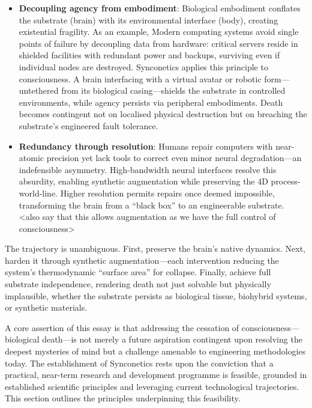\documentclass[10pt]{article}
\begin{document}
\begin{sloppypar}
  \begin{itemize}
    \item \textbf{Decoupling agency from embodiment}: Biological embodiment conflates the substrate (brain) with its environmental interface (body), creating existential fragility. As an example, Modern computing systems avoid single points of failure by decoupling data from hardware: critical servers reside in shielded facilities with redundant power and backups, surviving even if individual nodes are destroyed. Synconetics applies this principle to consciousness. A brain interfacing with a virtual avatar or robotic form—untethered from its biological casing—shields the substrate in controlled environments, while agency persists via peripheral embodiments. Death becomes contingent not on localised physical destruction but on breaching the substrate’s engineered fault tolerance.
    \item \textbf{Redundancy through resolution}: Humans repair computers with near-atomic precision yet lack tools to correct even minor neural degradation—an indefensible asymmetry. High-bandwidth neural interfaces resolve this absurdity, enabling synthetic augmentation while preserving the 4D process-world-line. Higher resolution permits repairs once deemed impossible, transforming the brain from a “black box” to an engineerable substrate. <also say that this allows augmentation as we have the full control of consciousness>
  \end{itemize}

  The trajectory is unambiguous. First, preserve the brain’s native dynamics. Next, harden it through synthetic augmentation—each intervention reducing the system’s thermodynamic “surface area” for collapse. Finally, achieve full substrate independence, rendering death not just solvable but physically implausible, whether the substrate persists as biological tissue, biohybrid systems, or synthetic materials.

  A core assertion of this essay is that addressing the cessation of consciousness—biological death—is not merely a future aspiration contingent upon resolving the deepest mysteries of mind but a challenge amenable to engineering methodologies today. The establishment of Synconetics rests upon the conviction that a practical, near-term research and development programme is feasible, grounded in established scientific principles and leveraging current technological trajectories. This section outlines the principles underpinning this feasibility.


\end{sloppypar}
\end{document}
